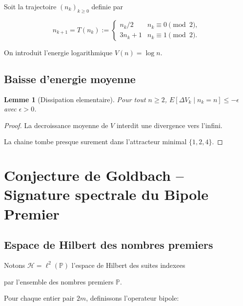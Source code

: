 ﻿\documentclass[12pt]{article}
\newtheorem{lemma}{Lemme}
\begin{document}
Soit la trajectoire $(n_k)_{k\ge 0}$ definie par

\[

n_{k+1}=T(n_k):=

\begin{cases}

  n_k/2 & n_k \equiv 0 \pmod 2,\\

  3n_k+1 & n_k \equiv 1 \pmod 2.

\end{cases}

\]

On introduit l'energie logarithmique $V(n)=\log n$.



\subsection{Baisse d'energie moyenne}

\begin{lemma}[Dissipation elementaire]

Pour tout $n\ge 2$, $E[\Delta V_k \mid n_k=n] \le -\epsilon$ avec $\epsilon>0$.

\end{lemma}



\begin{proof}

La decroissance moyenne de $V$ interdit une divergence vers l'infini.

La chaine tombe presque surement dans l'attracteur minimal $\{1,2,4\}$.

\end{proof}



\section{Conjecture de Goldbach -- Signature spectrale du Bipole Premier}

\subsection{Espace de Hilbert des nombres premiers}

Notons $\mathcal H=\ell^2(\mathbb P)$ l'espace de Hilbert des suites indexees

par l'ensemble des nombres premiers $\mathbb P$.

Pour chaque entier pair $2m$, definissons l'operateur bipole:
\end{document}
